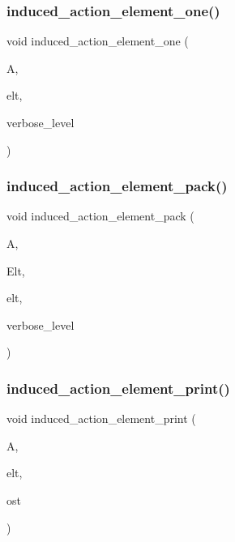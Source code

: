 \subsubsection{\texorpdfstring{induced\+\_\+action\+\_\+element\+\_\+one()}{induced\_action\_element\_one()}}
{\footnotesize\ttfamily void induced\+\_\+action\+\_\+element\+\_\+one (\begin{DoxyParamCaption}\item[{\mbox{\hyperlink{classaction}{action}} \&}]{A,  }\item[{void $\ast$}]{elt,  }\item[{\mbox{\hyperlink{galois_8h_a09fddde158a3a20bd2dcadb609de11dc}{I\+NT}}}]{verbose\+\_\+level }\end{DoxyParamCaption})}

\mbox{\label{interface_8_c_aa80cbe650affcff950137367a431715f}} 
\subsubsection{\texorpdfstring{induced\+\_\+action\+\_\+element\+\_\+pack()}{induced\_action\_element\_pack()}}
{\footnotesize\ttfamily void induced\+\_\+action\+\_\+element\+\_\+pack (\begin{DoxyParamCaption}\item[{\mbox{\hyperlink{classaction}{action}} \&}]{A,  }\item[{void $\ast$}]{Elt,  }\item[{void $\ast$}]{elt,  }\item[{\mbox{\hyperlink{galois_8h_a09fddde158a3a20bd2dcadb609de11dc}{I\+NT}}}]{verbose\+\_\+level }\end{DoxyParamCaption})}

\mbox{\label{interface_8_c_a670952bd230bf34b82f276deab684d23}} 
\subsubsection{\texorpdfstring{induced\+\_\+action\+\_\+element\+\_\+print()}{induced\_action\_element\_print()}}
{\footnotesize\ttfamily void induced\+\_\+action\+\_\+element\+\_\+print (\begin{DoxyParamCaption}\item[{\mbox{\hyperlink{classaction}{action}} \&}]{A,  }\item[{void $\ast$}]{elt,  }\item[{ostream \&}]{ost }\end{DoxyParamCaption})}

